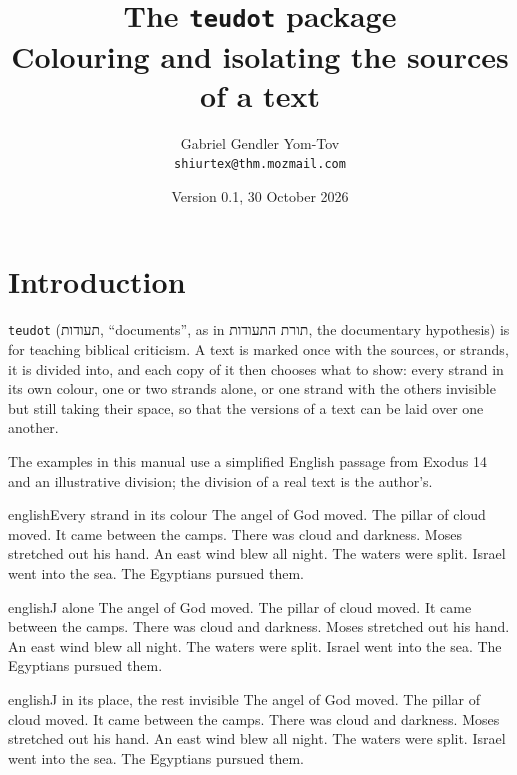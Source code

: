 \documentclass[11pt]{article}
\title{The \texttt{teudot} package\\[0.3em]\large Colouring and isolating the sources of a text}
\author{Gabriel Gendler Yom-Tov\\\small\texttt{shiurtex@thm.mozmail.com}}
\date{Version 0.1, 30 October 2026}
\begin{document}
\maketitle

\section{Introduction}

\texttt{teudot} (\texthebrew{תעודות}, ``documents'', as in \texthebrew{תורת התעודות}, the
documentary hypothesis) is for teaching biblical criticism. A text is marked once with the
sources, or strands, it is divided into, and each copy of it then chooses what to show: every
strand in its own colour, one or two strands alone, or one strand with the others invisible but
still taking their space, so that the versions of a text can be laid over one another.

The examples in this manual use a simplified English passage from Exodus 14 and an illustrative
division; the division of a real text is the author's.

\begin{mekor}
\begin{mekorlang}{english}{Every strand in its colour}
\pasuk[14:19]  The angel of God moved.  The pillar of cloud moved. \pasuk {} It came between the camps.  There was cloud and darkness. \pasuk {} Moses stretched out his hand.  An east wind blew all night.  The waters were split. \pasuk Israel went into the sea. \pasuk {} The Egyptians pursued them.
\end{mekorlang}
\end{mekor}
\begin{mekor*}
\begin{mekorlang}{english}{J alone}
\pasuk[14:19]  The angel of God moved.  The pillar of cloud moved. \pasuk {} It came between the camps.  There was cloud and darkness. \pasuk {} Moses stretched out his hand.  An east wind blew all night.  The waters were split. \pasuk Israel went into the sea. \pasuk {} The Egyptians pursued them.
\end{mekorlang}
\end{mekor*}
\begin{mekor*}
\begin{mekorlang}{english}{J in its place, the rest invisible}
\pasuk[14:19]  The angel of God moved.  The pillar of cloud moved. \pasuk {} It came between the camps.  There was cloud and darkness. \pasuk {} Moses stretched out his hand.  An east wind blew all night.  The waters were split. \pasuk Israel went into the sea. \pasuk {} The Egyptians pursued them.
\end{mekorlang}
\end{mekor*}
\end{document}
